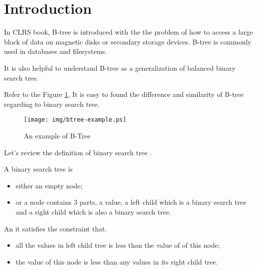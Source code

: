 \documentclass{article}
\begin{document}

\maketitle

\section{Introduction}
\label{introduction}

In CLRS book, B-tree is introduced with the the problem of how to access a
large block of data on magnetic disks or secondary storage devices\cite{CLRS}.
B-tree is commonly used in databases and filesystems.

It is also helpful to understand B-tree as a generalization of balanced binary
search tree\cite{wiki-b-tree}.

Refer to the Figure \ref{fig:btree-example}, It is easy to found the difference
and similarity of B-tree regarding to binary search tree.

\begin{figure}[htbp]
       \begin{center}
	\texttt{[image: img/btree-example.ps]}
        \caption{An example of B-Tree} \label{fig:btree-example}
       \end{center}
\end{figure}

Let's review the definition of binary search tree \cite{lxy-bst}.

A binary search tree is 
\begin{itemize}
\item either an empty node;
\item or a node contains 3 parts, a value, a left child which is a
binary search tree and a right child which is also a binary search tree.
\end{itemize}

An it satisfies the constraint that.
\begin{itemize}
\item all the values in left child tree is less than the value of of this node;
\item the value of this node is less than any values in its right child tree.
\end{itemize}
\end{document}
